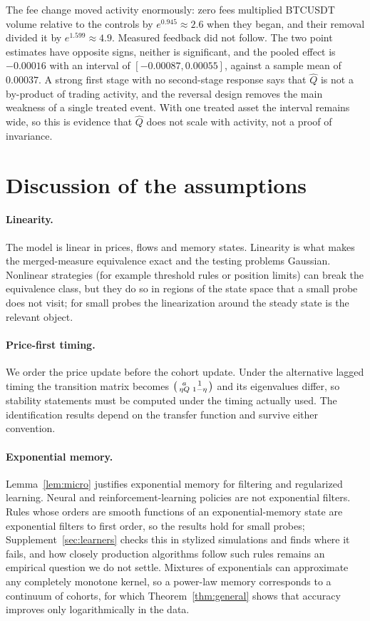 \documentclass[12pt]{article}
\theoremstyle{definition}
\theoremstyle{remark}
\begin{document}
The fee change moved activity enormously: zero fees multiplied BTCUSDT volume relative to the controls by $e^{0.945}\approx2.6$ when they began, and their removal divided it by $e^{1.599}\approx4.9$. Measured feedback did not follow. The two point estimates have opposite signs, neither is significant, and the pooled effect is $-0.00016$ with an interval of $[-0.00087,0.00055]$, against a sample mean of $0.00037$. A strong first stage with no second-stage response says that $\hat Q$ is not a by-product of trading activity, and the reversal design removes the main weakness of a single treated event. With one treated asset the interval remains wide, so this is evidence that $\hat Q$ does not scale with activity, not a proof of invariance.

\section{Discussion of the assumptions}\label{sec:assumptions}

\paragraph{Linearity.} The model is linear in prices, flows and memory states. Linearity is what makes the merged-measure equivalence exact and the testing problems Gaussian. Nonlinear strategies (for example threshold rules or position limits) can break the equivalence class, but they do so in regions of the state space that a small probe does not visit; for small probes the linearization around the steady state is the relevant object.

\paragraph{Price-first timing.} We order the price update before the cohort update. Under the alternative lagged timing the transition matrix becomes $\begin{psmallmatrix}a&1\\ \eta Q&1-\eta\end{psmallmatrix}$ and its eigenvalues differ, so stability statements must be computed under the timing actually used. The identification results depend on the transfer function and survive either convention.

\paragraph{Exponential memory.} Lemma~\ref{lem:micro} justifies exponential memory for filtering and regularized learning. Neural and reinforcement-learning policies are not exponential filters. Rules whose orders are smooth functions of an exponential-memory state are exponential filters to first order, so the results hold for small probes; Supplement~\ref{sec:learners} checks this in stylized simulations and finds where it fails, and how closely production algorithms follow such rules remains an empirical question we do not settle. Mixtures of exponentials can approximate any completely monotone kernel, so a power-law memory corresponds to a continuum of cohorts, for which Theorem~\ref{thm:general} shows that accuracy improves only logarithmically in the data.
\end{document}

